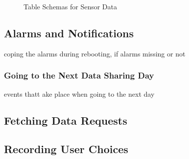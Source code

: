 \begin{figure}[htp]


\hspace{1em}
%

\caption{Table Schemas for Sensor Data}
\label{fig:ts22}
\end{figure}

\subsection{Alarms and Notifications}

coping the alarms during rebooting, if alarms missing or not

\subsubsection{Going to the Next Data Sharing Day}
events thatt ake place when going to the next day


\subsection{Fetching Data Requests}




\subsection{Recording User Choices}

